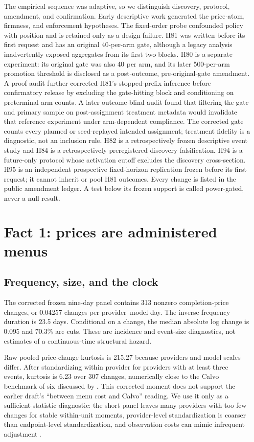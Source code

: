 \documentclass[11pt]{article}
\newcommand{\1}{\mathbf{1}}
\begin{document}
The empirical sequence was adaptive, so we distinguish discovery, protocol,
amendment, and confirmation.  Early descriptive work generated the price-atom,
firmness, and enforcement hypotheses.  The fixed-order probe confounded policy
with position and is retained only as a design failure.  H81 was written before
its first request and has an original 40-per-arm gate, although a legacy analysis
inadvertently exposed aggregates from its first two blocks.  H80 is a separate
experiment: its original gate was also 40 per arm, and its later 500-per-arm
promotion threshold is disclosed as a post-outcome, pre-original-gate amendment.
A proof audit further corrected H81's stopped-prefix inference before confirmatory
release by excluding the gate-hitting block and conditioning on preterminal arm
counts.  A later outcome-blind audit found that filtering the gate and primary
sample on post-assignment treatment metadata would invalidate that reference
experiment under arm-dependent compliance.  The corrected gate counts every
planned or seed-replayed intended assignment; treatment fidelity is a diagnostic,
not an inclusion rule.  H82 is a retrospectively frozen descriptive event study and H84 is a
retrospectively preregistered discovery falsification.  H94 is a future-only
protocol whose activation cutoff excludes the discovery cross-section.  H95 is
an independent prospective fixed-horizon replication frozen before its first
request; it cannot inherit or pool H81 outcomes.
Every change is listed in the public amendment ledger.  A test below its frozen
support is called power-gated, never a null result.

\section{Fact 1: prices are administered menus}
\label{sec:menus}

\subsection{Frequency, size, and the clock}

The corrected frozen nine-day panel contains 313 nonzero completion-price
changes, or 0.04257 changes per provider--model day.  The inverse-frequency
duration is 23.5 days.  Conditional on a change, the median absolute log change
is 0.095 and 70.3\% are cuts.  These are incidence and event-size diagnostics,
not estimates of a continuous-time structural hazard.

Raw pooled price-change kurtosis is 215.27 because providers and model scales
differ.  After standardizing within provider for providers with at least three
events, kurtosis is 6.23 over 307 changes, numerically close to the Calvo benchmark
of six discussed by \citet{alvarezlebihanlippi2016}.  This corrected moment does
not support the earlier draft's ``between menu cost and Calvo'' reading.  We use
it only as a sufficient-statistic diagnostic: the short panel leaves many
providers with too few changes for stable within-unit moments, provider-level
standardization is coarser than endpoint-level standardization, and observation
costs can mimic infrequent adjustment \cite{alvarezlippipaciello2011}.
\end{document}
